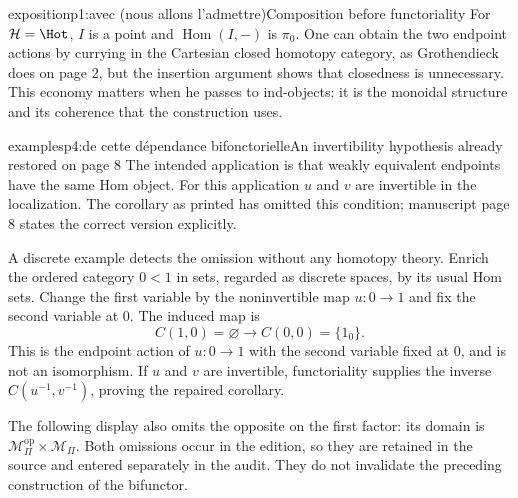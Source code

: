 \begin{dcomment}{exposition}{p1:avec (nous allons l'admettre)}{Composition before functoriality}
For $\mathcal H=\Hot$, $I$ is a point and $\operatorname{Hom}(I,-)$ is $\pi_0$. One can obtain the two endpoint actions by currying in the Cartesian closed homotopy category, as Grothendieck does on page 2, but the insertion argument shows that closedness is unnecessary. This economy matters when he passes to ind-objects: it is the monoidal structure and its coherence that the construction uses.
\end{dcomment}

\begin{dcomment}{examples}{p4:de cette dépendance bifonctorielle}{An invertibility hypothesis already restored on page 8}
The intended application is that weakly equivalent endpoints have the same Hom object. For this application $u$ and $v$ are invertible in the localization. The corollary as printed has omitted this condition; manuscript page 8 states the correct version explicitly.

A discrete example detects the omission without any homotopy theory. Enrich the ordered category $0<1$ in sets, regarded as discrete spaces, by its usual Hom sets. Change the first variable by the noninvertible map $u:0\to1$ and fix the second variable at $0$. The induced map is
\[
 C(1,0)=\varnothing\longrightarrow C(0,0)=\{1_0\}.
\]
This is the endpoint action of $u:0\to1$ with the second variable fixed at $0$, and is not an isomorphism. If $u$ and $v$ are invertible, functoriality supplies the inverse $C(u^{-1},v^{-1})$, proving the repaired corollary.

The following display also omits the opposite on the first factor: its domain is $\mathcal M_\Pi^{\mathrm{op}}\times\mathcal M_\Pi$. Both omissions occur in the edition, so they are retained in the source and entered separately in the audit. They do not invalidate the preceding construction of the bifunctor.
\end{dcomment}

